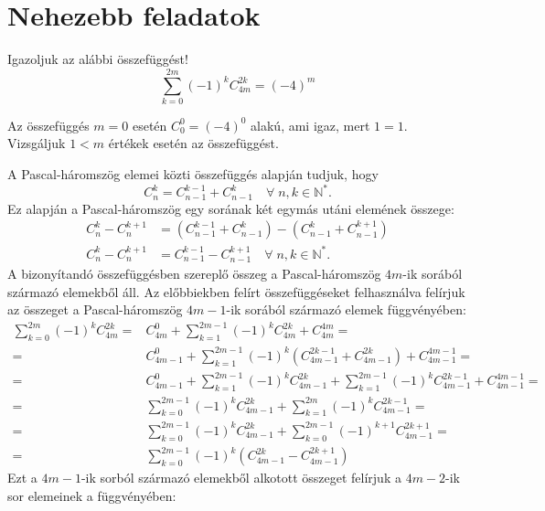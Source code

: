 \section*{Nehezebb feladatok}
\begin{extraproblem}
Igazoljuk az alábbi összefüggést! 
\[
\sum_{k=0}^{2m}(-1)^{k}C_{4m}^{2k}=(-4)^{m}
\]
\end{extraproblem}

\begin{solution}
Az összefüggés $m=0$ esetén $C_{0}^{0}=(-4)^{0}$ alakú, ami igaz,
mert $1=1$. Vizsgáljuk $1<m$ értékek esetén az összefüggést.

A Pascal-háromszög elemei közti összefüggés alapján tudjuk, hogy 
\begin{equation}
C_{n}^{k}=C_{n-1}^{k-1}+C_{n-1}^{k}\quad\forall\;n,k\in\mathbb{N}^{*}.
\end{equation}
Ez alapján a Pascal-háromszög egy sorának két egymás utáni elemének
összege: 
\begin{align}
C_{n}^{k}-C_{n}^{k+1} & =\left(C_{n-1}^{k-1}+C_{n-1}^{k}\right)-\left(C_{n-1}^{k}+C_{n-1}^{k+1}\right)\nonumber \\
C_{n}^{k}-C_{n}^{k+1} & =C_{n-1}^{k-1}-C_{n-1}^{k+1}\quad\forall\;n,k\in\mathbb{N}^{*}.
\end{align}
A bizonyítandó összefüggésben szereplő összeg a Pascal-háromszög $4m$-ik
sorából származó elemekből áll. Az előbbiekben felírt összefüggéseket
felhasználva felírjuk az összeget a Pascal-háromszög $4m-1$-ik sorából
származó elemek függvényében: 
\begin{align*}
\sum_{k=0}^{2m}(-1)^{k}C_{4m}^{2k}= & C_{4m}^{0}+\sum_{k=1}^{2m-1}(-1)^{k}C_{4m}^{2k}+C_{4m}^{4m}=\\
= & C_{4m-1}^{0}+\sum_{k=1}^{2m-1}(-1)^{k}\left(C_{4m-1}^{2k-1}+C_{4m-1}^{2k}\right)+C_{4m-1}^{4m-1}=\\
= & C_{4m-1}^{0}+\sum_{k=1}^{2m-1}(-1)^{k}C_{4m-1}^{2k}+\sum_{k=1}^{2m-1}(-1)^{k}C_{4m-1}^{2k-1}+C_{4m-1}^{4m-1}=\\
= & \sum_{k=0}^{2m-1}(-1)^{k}C_{4m-1}^{2k}+\sum_{k=1}^{2m}(-1)^{k}C_{4m-1}^{2k-1}=\\
= & \sum_{k=0}^{2m-1}(-1)^{k}C_{4m-1}^{2k}+\sum_{k=0}^{2m-1}(-1)^{k+1}C_{4m-1}^{2k+1}=\\
= & \sum_{k=0}^{2m-1}(-1)^{k}\left(C_{4m-1}^{2k}-C_{4m-1}^{2k+1}\right)
\end{align*}
Ezt a $4m-1$-ik sorból származó elemekből alkotott összeget felírjuk
a $4m-2$-ik sor elemeinek a függvényében: 
\begin{align*}

\end{align*}
\end{solution}
